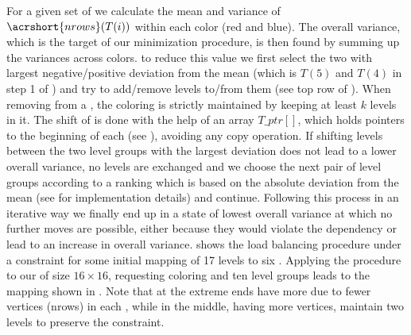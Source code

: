 For a given set of \levelGroups we calculate the mean and variance of
$\acrshort{nrows}(T(i))$ within each color (red and blue).
The overall variance,
which is the target of our minimization procedure, is then found by summing up
the variances across colors. \Inorder to reduce this value we first select the
two \levelGroups with largest negative/positive deviation from the mean (which
is $T(5)$ and $T(4)$ in step 1 of ) and try to add/remove
levels to/from them (see top row of ). When
removing \levels from a \levelGroup, the \DK coloring is strictly maintained 
by keeping at least $k$ levels in it. The shift of
\levels is done with the help of an array  $T\_ptr[]$, which holds pointers to the
beginning of each \levelGroup (see ), avoiding any copy
operation. If shifting levels between the two level groups with the largest
deviation does not lead to a lower overall variance, no levels are exchanged and
we choose the next pair of level groups according to a ranking which is based on
the absolute deviation from the mean (see  for implementation
details) and continue. Following this process in an iterative way we finally end
up in a state of lowest overall variance at which no further moves are
possible, either because they would violate the \DK dependency or lead to
an increase in overall
variance.  shows the load balancing procedure under a \DTWO
constraint for some initial mapping of 17 levels to six \levelGroups. Applying
the procedure to our \stex of size $16 \times 16$, requesting \DTWO coloring and
ten level groups leads to the mapping shown in . Note that
\levelGroups at the extreme ends have more \levels due to fewer vertices
(\acrshort{nrows}) in each \level, while \levelGroups in the middle, having more
vertices, maintain two levels to preserve the \DTWO constraint.

  
